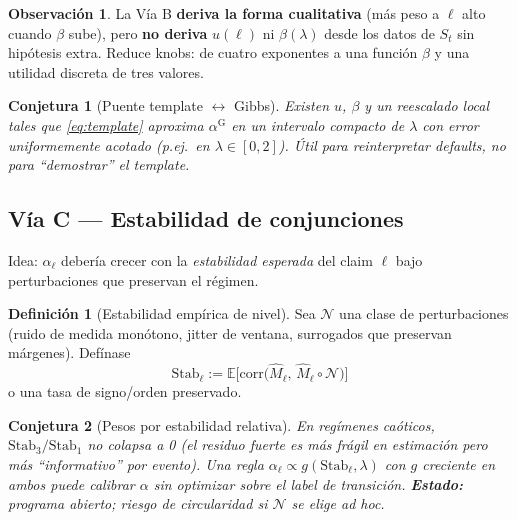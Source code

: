 \documentclass[11pt,a4paper]{article}
\theoremstyle{definition}
\newtheorem{definition}{Definici\'on}[section]
\newtheorem{remark}{Observaci\'on}[section]
\theoremstyle{plain}
\newtheorem{conjecture}{Conjetura}[section]
\theoremstyle{remark}
\begin{document}
\begin{remark}
La V\'ia B \textbf{deriva la forma cualitativa} (más peso a $\ell$ alto
cuando $\beta$ sube), pero \textbf{no deriva} $u(\ell)$ ni
$\beta(\lambda)$ desde los datos de $S_t$ sin hip\'otesis extra. Reduce
knobs: de cuatro exponentes a una funci\'on $\beta$ y una utilidad
discreta de tres valores.
\end{remark}

\begin{conjecture}[Puente template $\leftrightarrow$ Gibbs]
\label{conj:gibbs}
Existen $u$, $\beta$ y un reescalado local tales que
\eqref{eq:template} aproxima $\alpha^{\mathrm{G}}$ en un intervalo
compacto de $\lambda$ con error uniformemente acotado (p.ej.\ en
$\lambda\in[0,2]$). \'Util para reinterpretar defaults, no para
``demostrar'' el template.
\end{conjecture}

\subsection{V\'ia C --- Estabilidad de conjunciones}

Idea: $\alpha_\ell$ deber\'ia crecer con la \emph{estabilidad esperada}
del claim $\ell$ bajo perturbaciones que preservan el r\'egimen.

\begin{definition}[Estabilidad emp\'irica de nivel]
\label{def:stab}
Sea $\mathcal{N}$ una clase de perturbaciones (ruido de medida mon\'otono,
jitter de ventana, surrogados que preservan m\'argenes). Def\'inase
\begin{equation}
\mathrm{Stab}_\ell
:=\mathbb{E}\bigl[
\mathrm{corr}\bigl(\widehat{M}_\ell,\,\widehat{M}_\ell\circ\mathcal{N}\bigr)
\bigr]
\end{equation}
o una tasa de signo/orden preservado.
\end{definition}

\begin{conjecture}[Pesos por estabilidad relativa]
\label{conj:stab}
En regímenes caóticos, $\mathrm{Stab}_3/\mathrm{Stab}_1$ no colapsa a 0
(el residuo fuerte es m\'as fr\'agil en estimación pero m\'as
``informativo'' por evento). Una regla
$\alpha_\ell\propto g(\mathrm{Stab}_\ell,\lambda)$ con $g$ creciente en
ambos puede \emph{calibrar} $\alpha$ sin optimizar sobre el label de
transici\'on. \textbf{Estado:} programa abierto; riesgo de
circularidad si $\mathcal{N}$ se elige ad hoc.
\end{conjecture}
\end{document}
